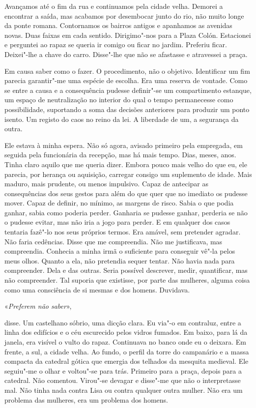 Avançamos até o fim da rua e continuamos pela cidade velha. Demorei a
encontrar a saída, mas acabamos por desembocar junto do rio, não muito
longe da ponte romana. Contornamos os bairros antigos e apanhamos as
avenidas novas. Duas faixas em cada sentido. Dirigimo"-nos para a Plaza
Colón. Estacionei e perguntei ao rapaz se queria ir comigo ou ficar no
jardim. Preferiu ficar. Deixei"-lhe a chave do carro. Disse"-lhe que não
se afastasse e atravessei a praça.

Em causa saber como o fazer. O procedimento, não o objetivo.
Identificar um fim parecia garantir"-me uma espécie de escolha. Era uma
reserva de vontade. Como se entre a causa e a consequência pudesse
definir"-se um compartimento estanque, um espaço de neutralização no
interior do qual o tempo permanecesse como possibilidade, suportando a
soma das decisões anteriores para produzir um ponto isento. Um registo
do caos no reino da lei. A liberdade de um, a segurança da outra.

Ele estava à minha espera. Não só agora, avisado primeiro pela
empregada, em seguida pela funcionária da recepção, mas há mais tempo.
Dias, meses, anos. Tinha claro aquilo que me queria dizer. Embora pouco
mais velho do que eu, ele parecia, por herança ou aquisição, carregar
consigo um suplemento de idade. Mais maduro, mais prudente, ou menos
impulsivo. Capaz de antecipar as consequências dos seus gestos para além
do que quer que no imediato os pudesse mover. Capaz de definir, no
mínimo, as margens de risco. Sabia o que podia ganhar, sabia como
poderia perder. Ganharia se pudesse ganhar, perderia se não o pudesse
evitar, mas não iria a jogo para perder. E em qualquer dos casos
tentaria fazê"-lo nos seus próprios termos. Era amável, sem pretender
agradar. Não faria cedências. Disse que me compreendia. Não me
justificava, mas compreendia. Conhecia a minha irmã o suficiente para
conseguir vê"-la pelos meus olhos. Quanto a ela, não pretendia sequer
tentar. Não havia nada para compreender. Dela e das outras. Seria
possível descrever, medir, quantificar, mas não compreender. Tal suporia
que existisse, por parte das mulheres, alguma coisa como uma consciência
de si mesmas e dos homens. Duvidava.

«\emph{Preferem não saber}»,

disse. Um castelhano sóbrio, uma dicção clara. Eu via"-o em contraluz,
entre a linha dos edifícios e o céu escurecido pelos vidros fumados. Em
baixo, para lá da janela, era visível o vulto do rapaz. Continuava no
banco onde eu o deixara. Em frente, a sul, a cidade velha. Ao fundo, o
perfil da torre do campanário e a massa compacta da catedral gótica que
emergia dos telhados da mesquita medieval. Ele seguiu"-me o olhar e
voltou"-se para trás. Primeiro para a praça, depois para a catedral. Não
comentou. Virou"-se devagar e disse"-me que não o interpretasse mal. Não
tinha nada contra Lisa ou contra qualquer outra mulher. Não era um
problema das mulheres, era um problema dos homens.

